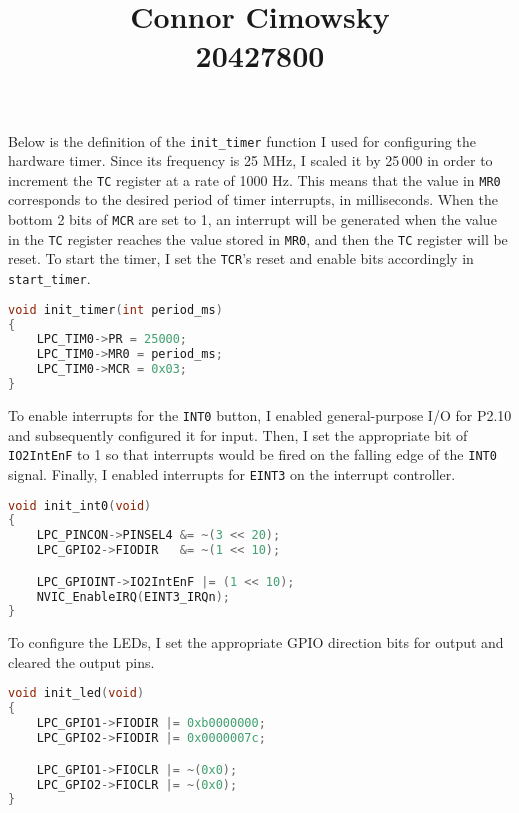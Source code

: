 \documentclass[11pt]{article}
\title{Connor Cimowsky\protect\\20427800}
\date{}
\begin{document}
\maketitle

Below is the definition of the \texttt{init\_timer} function I used for
configuring the hardware timer. Since its frequency is 25 MHz, I scaled it by
25\,000 in order to increment the \texttt{TC} register at a rate of 1000 Hz.
This means that the value in \texttt{MR0} corresponds to the desired period of
timer interrupts, in milliseconds. When the bottom 2 bits of \texttt{MCR} are
set to 1, an interrupt will be generated when the value in the \texttt{TC}
register reaches the value stored in \texttt{MR0}, and then the \texttt{TC}
register will be reset. To start the timer, I set the \texttt{TCR}'s reset and
enable bits accordingly in \texttt{start\_timer}.

\begin{lstlisting}[language=c, frame=single]
void init_timer(int period_ms)
{
    LPC_TIM0->PR = 25000;
    LPC_TIM0->MR0 = period_ms;
    LPC_TIM0->MCR = 0x03;
}
\end{lstlisting}
\vspace{1em}

To enable interrupts for the \texttt{INT0} button, I enabled general-purpose
I/O for P2.10 and subsequently configured it for input. Then, I set the
appropriate bit of \texttt{IO2IntEnF} to 1 so that interrupts would be fired on
the falling edge of the \texttt{INT0} signal. Finally, I enabled interrupts for
\texttt{EINT3} on the interrupt controller.

\begin{lstlisting}[language=c, frame=single]
void init_int0(void)
{
    LPC_PINCON->PINSEL4 &= ~(3 << 20);
    LPC_GPIO2->FIODIR   &= ~(1 << 10);

    LPC_GPIOINT->IO2IntEnF |= (1 << 10);
    NVIC_EnableIRQ(EINT3_IRQn);
}
\end{lstlisting}
\vspace{1em}

To configure the LEDs, I set the appropriate GPIO direction bits for
output and cleared the output pins.

\begin{lstlisting}[language=c, frame=single]
void init_led(void)
{
    LPC_GPIO1->FIODIR |= 0xb0000000;
    LPC_GPIO2->FIODIR |= 0x0000007c;

    LPC_GPIO1->FIOCLR |= ~(0x0);
    LPC_GPIO2->FIOCLR |= ~(0x0);
}
\end{lstlisting}
\vspace{0.6em}
\end{document}
